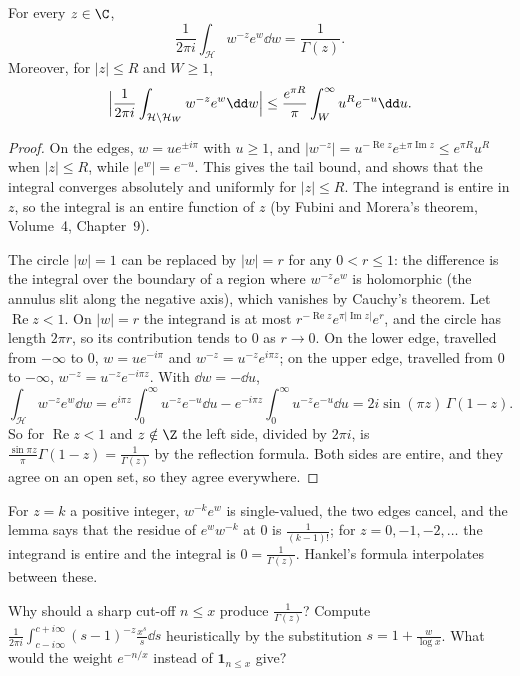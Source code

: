 \begin{lemma}[Hankel, 1864]\label{lem:hankel}
For every $z\in\C$,
\[
\frac1{2\pi i}\int_{\mathcal H}w^{-z}e^w\dd w=\frac1{\Gamma(z)}.
\]
Moreover, for $|z|\le R$ and $W\ge1$,
\[
\Bigl|\frac1{2\pi i}\int_{\mathcal H\setminus\mathcal H_W}w^{-z}e^w\dd w\Bigr|\le\frac{e^{\pi R}}\pi\int_W^\infty u^Re^{-u}\dd u.
\]
\end{lemma}
\begin{proof}
On the edges, $w=ue^{\pm i\pi}$ with $u\ge1$, and $|w^{-z}|=u^{-\operatorname{Re}z}e^{\pm\pi\operatorname{Im}z}\le e^{\pi R}u^R$ when $|z|\le R$, while $|e^w|=e^{-u}$. This gives the tail bound, and shows that the integral converges absolutely and uniformly for $|z|\le R$. The integrand is entire in $z$, so the integral is an entire function of $z$ (by Fubini and Morera's theorem, Volume~4, Chapter~9).

The circle $|w|=1$ can be replaced by $|w|=r$ for any $0<r\le1$: the difference is the integral over the boundary of a region where $w^{-z}e^w$ is holomorphic (the annulus slit along the negative axis), which vanishes by Cauchy's theorem. Let $\operatorname{Re}z<1$. On $|w|=r$ the integrand is at most $r^{-\operatorname{Re}z}e^{\pi|\operatorname{Im}z|}e^r$, and the circle has length $2\pi r$, so its contribution tends to $0$ as $r\to0$. On the lower edge, travelled from $-\infty$ to $0$, $w=ue^{-i\pi}$ and $w^{-z}=u^{-z}e^{i\pi z}$; on the upper edge, travelled from $0$ to $-\infty$, $w^{-z}=u^{-z}e^{-i\pi z}$. With $\dd w=-\dd u$,
\[
\int_{\mathcal H}w^{-z}e^w\dd w=e^{i\pi z}\int_0^\infty u^{-z}e^{-u}\dd u-e^{-i\pi z}\int_0^\infty u^{-z}e^{-u}\dd u=2i\sin(\pi z)\,\Gamma(1-z).
\]
So for $\operatorname{Re}z<1$ and $z\notin\Z$ the left side, divided by $2\pi i$, is $\frac{\sin\pi z}\pi\Gamma(1-z)=\frac1{\Gamma(z)}$ by the reflection formula. Both sides are entire, and they agree on an open set, so they agree everywhere.
\end{proof}

For $z=k$ a positive integer, $w^{-k}e^w$ is single-valued, the two edges cancel, and the lemma says that the residue of $e^ww^{-k}$ at $0$ is $\frac1{(k-1)!}$; for $z=0,-1,-2,\dots$ the integrand is entire and the integral is $0=\frac1{\Gamma(z)}$. Hankel's formula interpolates between these.

\begin{think}
Why should a sharp cut-off $n\le x$ produce $\frac1{\Gamma(z)}$? Compute $\frac1{2\pi i}\int_{c-i\infty}^{c+i\infty}(s-1)^{-z}\frac{x^s}s\dd s$ heuristically by the substitution $s=1+\frac w{\log x}$. What would the weight $e^{-n/x}$ instead of $\mathbf 1_{n\le x}$ give?
\end{think}

